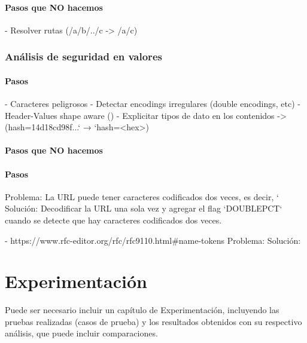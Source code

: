 \documentclass{prgrado}
\begin{document}
\subsubsection{Pasos que NO hacemos}

- Resolver rutas (/a/b/../c -> /a/c)

\subsection{Análisis de seguridad en valores}

\subsubsection{Pasos}

- Caracteres peligrosos
- Detectar encodings irregulares (double encodings, etc)
- Header-Values shape aware ()
- Explicitar tipos de dato en los contenidos -> (hash=14d18cd98f...` → `hash=<hex>)

\subsubsection{Pasos que NO hacemos}

 
 

\subsubsection{Pasos}


Problema: La URL puede tener caracteres codificados dos veces, es decir, `%
Solución: Decodificar la URL una sola vez y agregar el flag `DOUBLEPCT` cuando se detecte que hay caracteres codificados dos veces.

 

 - https://www.rfc-editor.org/rfc/rfc9110.html#name-tokens
Problema: 
Solución: 

 

 




\chapter{Experimentación}
Puede ser necesario incluir un capítulo de Experimentación, incluyendo las pruebas realizadas (casos de prueba) y los resultados obtenidos con su respectivo análisis, que puede incluir comparaciones. 
\end{document}
